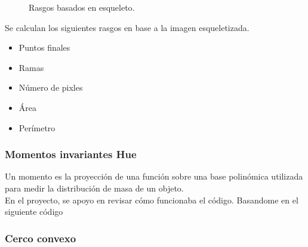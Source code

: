 \documentclass[a4paper, 11pt]{article}
\begin{document}
\begin{figure}[ht]%
    \centering
    \qquad
    \caption{Rasgos basados en esqueleto.}%
    \label{entropia}%
\end{figure}

Se calculan los siguientes rasgos en base a la imagen esqueletizada.

\begin{itemize}
\item Puntos finales
\item Ramas
\item Número de pixles
\item Área
\item Perímetro
\end{itemize}

\subsubsection{Momentos invariantes Hue}

Un momento es la proyección de una función sobre una base polinómica utilizada para medir la distribución de masa de un objeto.\\

En el proyecto, se apoyo en revisar cómo funcionaba el código. Basandome en el siguiente código \cite{github}


\subsubsection{Cerco convexo}
\end{document}
